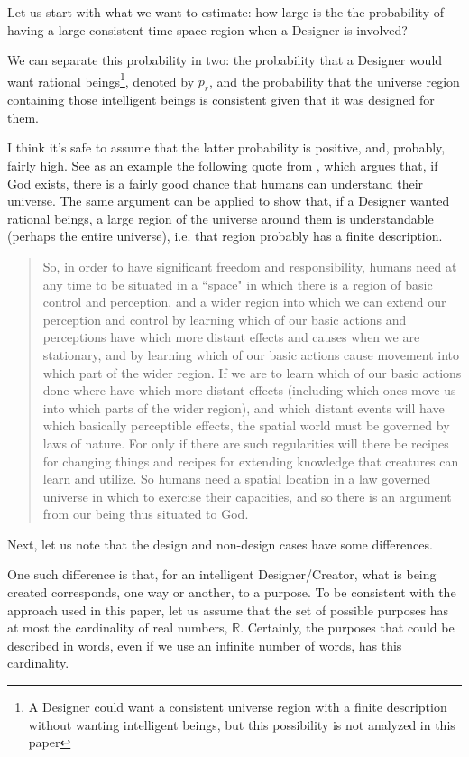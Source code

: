 \documentclass[a4paper
,draft
]{article}
\def\reale{\mathbb{R}}
\newcommand{\paper}[1]{paper}
\newcommand{\ghilimele}[1]{``#1"}
\begin{document}
Let us start with what we want to estimate:
how large is the the probability of having
a large consistent time-space region when a Designer is involved?

We can separate this probability in two: the probability that a Designer
would want rational beings\footnote{A Designer could want a consistent universe
region with a finite
description without wanting intelligent beings, but this possibility is not
analyzed in this paper}, denoted by $p_r$, and
the probability that the universe region containing
those intelligent beings is consistent
given that it was designed for them.

I think it's safe to assume that the latter probability is positive,
and, probably, fairly high. See as an example the following quote from
\textcite{Swinburne2003}, which argues that, if God exists,
there is a fairly good chance that humans can understand their universe.
The same argument can be applied to show that, if a Designer wanted
rational beings, a large region of the universe around them is understandable
(perhaps the entire universe), i.e. that region probably has a finite
description.

\begin{quote}
  So, in order to have significant freedom and responsibility, humans need
  at any time to be situated in a \ghilimele{space} in which there is a
  region of basic control and perception, and a wider region into which
  we can extend our perception and control by learning which of our
  basic actions and perceptions have which more distant effects and causes
  when we are stationary, and by learning which of our basic actions cause
  movement into which part of the wider region.
  If we are to learn which of our basic actions done where have which
  more distant effects (including which ones move us into which parts
  of the wider region), and which distant events will have which basically
  perceptible effects, the spatial world must be governed by laws of nature.
  For only if there are such regularities will there be recipes for changing
  things and recipes for extending knowledge that creatures can learn and
  utilize.
  So humans need a spatial location in a law governed universe in which to
  exercise their capacities, and so there is an argument from our being thus
  situated to God.
\end{quote}

Next, let us note that the design and non-design cases
have some differences.

One such difference is that, for an intelligent Designer/Creator, what is being
created corresponds, one way or another, to a purpose.
To be consistent with
the approach used in this \paper{}, let us assume that the set of possible
purposes has at most the cardinality of real numbers, $\reale$. Certainly,
the purposes that could be described in words, even if we use an infinite
number of words, has this cardinality.
\end{document}
